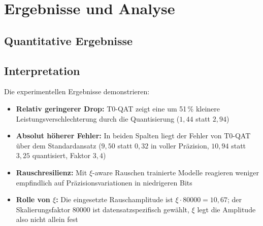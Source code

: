 	\section{Ergebnisse und Analyse}
	
	\subsection{Quantitative Ergebnisse}
	
	\begin{table}[h]
		\centering
		\caption{Leistungsvergleich unter Quantisierungsrauschen}
		\label{tab:results}
	\end{table}
	
	\subsection{Interpretation}
	
	Die experimentellen Ergebnisse demonstrieren:
	
	\begin{itemize}
		\item \textbf{Relativ geringerer Drop:} T0-QAT zeigt eine um 51\,\% kleinere Leistungsverschlechterung durch die Quantisierung ($1{,}44$ statt $2{,}94$)
		\item \textbf{Absolut höherer Fehler:} In beiden Spalten liegt der Fehler von T0-QAT über dem Standardansatz ($9{,}50$ statt $0{,}32$ in voller Präzision, $10{,}94$ statt $3{,}25$ quantisiert, Faktor $3{,}4$)
		\item \textbf{Rauschresilienz:} Mit $\xi$-aware Rauschen trainierte Modelle reagieren weniger empfindlich auf Präzisionsvariationen in niedrigeren Bits
		\item \textbf{Rolle von $\xi$:} Die eingesetzte Rauschamplitude ist $\xi \cdot 80000 = 10{,}67$; der Skalierungsfaktor $80000$ ist datensatzspezifisch gewählt, $\xi$ legt die Amplitude also nicht allein fest
	\end{itemize}
	
